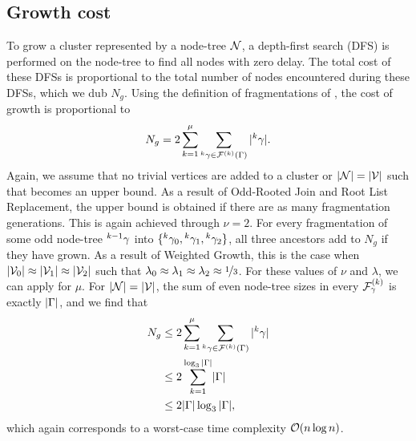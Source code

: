 \subsection{Growth cost}\label{sec:growthcost}

To grow a cluster represented by a node-tree $\mathcal{N}$, a depth-first search (DFS) is performed on the node-tree to find all nodes with zero delay. The total cost of these DFSs is proportional to the total number of nodes encountered during these DFSs, which we dub $N_g$. Using the definition of fragmentations of , the cost of growth is proportional to
\begin{equation}\label{eq:ngrow}
  N_g = 2\sum_{k=1}^\mu{ \sum_{  {}^{k} \gamma \in \mathcal{F}^{(k)}(\Gamma) }{ \lvert {}^{k} \gamma\rvert} }.
\end{equation}
Again, we assume that no trivial vertices are added to a cluster or $|\mathcal{N}| = |\mathcal{V}|$ such that  becomes an upper bound. As a result of Odd-Rooted Join and Root List Replacement, the upper bound is obtained if there are as many fragmentation generations. This is again achieved through $\nu = 2$. For every fragmentation of some odd node-tree ${}^{k-1}\gamma$ into $\{{}^{k}\gamma_0, {}^{k}\gamma_1, {}^{k}\gamma_2\}$, all three ancestors add to $N_g$ if they have grown. As a result of Weighted Growth, this is the case when $\lvert\mathcal{V}_0\rvert\approx \lvert\mathcal{V}_1\rvert\approx\lvert\mathcal{V}_2\rvert$ such that $\lambda_0 \approx \lambda_1 \approx \lambda_2\approx \nicefrac{1}{3}$. For these values of $\nu$ and $\lambda$, we can apply  for $\mu$. For $|\mathcal{N}| = |\mathcal{V}|$, the sum of even node-tree sizes in every $\mathcal{F}_\gamma^{(k)}$ is exactly $\lvert\Gamma\rvert$, and we find that
\begin{align*}
  \nonumber N_g &\leq 2\sum_{k=1}^\mu{ \sum_{  {}^{k} \gamma \in \mathcal{F}^{(k)}(\Gamma) }{ \lvert {}^{k} \gamma\rvert}  } \\
  \nonumber         &\leq 2\sum_{k=1}^{\log_3{\lvert\Gamma\rvert}} \lvert\Gamma\rvert\\
                    &\leq 2\lvert\Gamma\rvert\log_3{\lvert\Gamma\rvert},
\end{align*}
which again corresponds to a worst-case time complexity $\mathcal{O}(n\log{n})$.